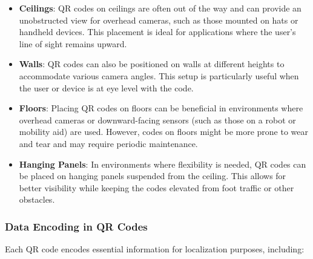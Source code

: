 \begin{itemize}
	\item \textbf{Ceilings}: QR codes on ceilings are often out of the way and can provide an unobstructed view for overhead cameras, such as those mounted on hats or handheld devices. This placement is ideal for applications where the user’s line of sight remains upward.
	
	\item \textbf{Walls}: QR codes can also be positioned on walls at different heights to accommodate various camera angles. This setup is particularly useful when the user or device is at eye level with the code.
	
	\item \textbf{Floors}: Placing QR codes on floors can be beneficial in environments where overhead cameras or downward-facing sensors (such as those on a robot or mobility aid) are used. However, codes on floors might be more prone to wear and tear and may require periodic maintenance.
	
	\item \textbf{Hanging Panels}: In environments where flexibility is needed, QR codes can be placed on hanging panels suspended from the ceiling. This allows for better visibility while keeping the codes elevated from foot traffic or other obstacles.
\end{itemize}

\subsubsection{Data Encoding in QR Codes}

Each QR code encodes essential information for localization purposes, including:


